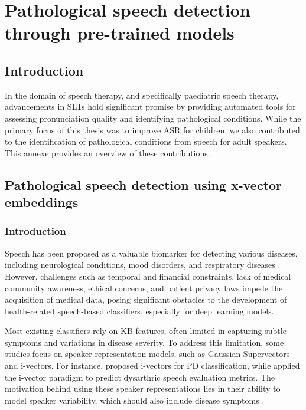 \chapter{Pathological speech detection through pre-trained models}
\label{chapter:appendixA}

\section{Introduction}
In the domain of speech therapy, and specifically paediatric speech therapy, advancements in \acp{SLT} hold significant promise by providing automated tools for assessing pronunciation quality and identifying pathological conditions. While the primary focus of this thesis was to improve \ac{ASR} for children, we also contributed to the identification of pathological conditions from speech for adult speakers. This annexe provides an overview of these contributions.


\section{Pathological speech detection using x-vector embeddings}
\subsection{Introduction}
Speech has been proposed as a valuable biomarker for detecting various diseases, including neurological conditions, mood disorders, and respiratory diseases \cite{hauptman2019identifying,botelho2019speech}. However, challenges such as temporal and financial constraints, lack of medical community awareness, ethical concerns, and patient privacy laws impede the acquisition of medical data, posing significant obstacles to the development of health-related speech-based classifiers, especially for deep learning models.

Most existing classifiers rely on \ac{KB} features, often limited in capturing subtle symptoms and variations in disease severity. To address this limitation, some studies focus on speaker representation models, such as Gaussian Supervectors and i-vectors. For instance, \cite{hauptman2019identifying} proposed i-vectors for \ac{PD} classification, while \cite{laaridh17_interspeech} applied the i-vector paradigm to predict dysarthric speech evaluation metrics. The motivation behind using these speaker representations lies in their ability to model speaker variability, which should also include disease symptoms \cite{hauptman2019identifying}.

